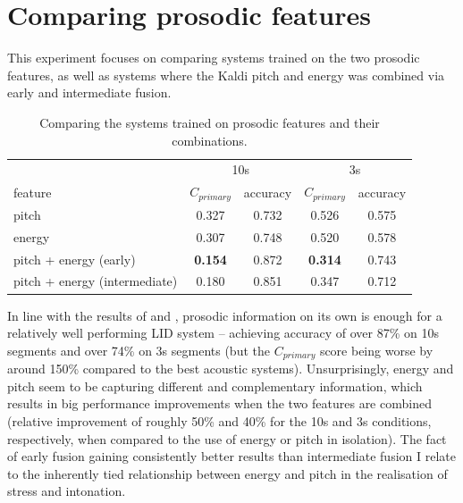 \documentclass[bsc,frontabs,twoside,singlespacing,parskip,deptreport]{infthesis}
\begin{document}
{  \section{Comparing prosodic features}{
    \label{sec:exp-prosodic}

    This experiment focuses on comparing systems trained on the two prosodic features, as well as systems where the Kaldi pitch and energy was combined via early and intermediate fusion.
    \begin{table}[h!tb]
      \centering
      \begin{sc}
        \footnotesize
        \begin{tabular}{l|cc|cc}
                  & \multicolumn{2}{c|}{10s}  & \multicolumn{2}{c}{3s} \\
          feature & $C_{primary}$ & accuracy & $C_{primary}$ & accuracy \\
          \hline
          pitch & 0.327 & 0.732 & 0.526 & 0.575\\
          energy & 0.307 & 0.748 & 0.520 & 0.578\\
          pitch + energy (early) & \textbf{0.154} & 0.872 & \textbf{0.314} & 0.743\\
          pitch + energy (intermediate) & 0.180 & 0.851 & 0.347 & 0.712\\
        \end{tabular}
      \end{sc}
      \caption{Comparing the systems trained on prosodic features and their combinations.}
      \label{tab:results-prosodic}
    \end{table}

    In line with the results of \citet{Lin_et_al_2005} and \citet{Martinez_et_al_2012}, prosodic information on its own is enough for a relatively well performing LID system -- achieving accuracy of over 87\% on 10s segments and over 74\% on 3s segments (but the $C_{primary}$ score being worse by around 150\% compared to the best acoustic systems). Unsurprisingly, energy and pitch seem to be capturing different and complementary information, which results in big performance improvements when the two features are combined (relative improvement of roughly 50\% and 40\% for the 10s and 3s conditions, respectively, when compared to the use of energy or pitch in isolation). The fact of early fusion gaining consistently better results than intermediate fusion I relate to the inherently tied relationship between energy and pitch in the realisation of stress and intonation.


}}
\end{document}

